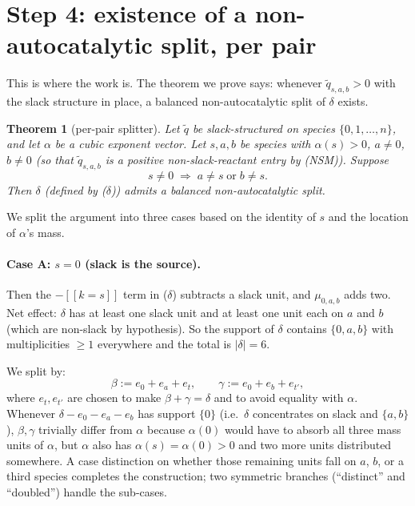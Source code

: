 \documentclass[11pt]{article}
\newtheorem{theorem}{Theorem}
\newcommand{\iv}[1]{[\![#1]\!]}
\begin{document}
\section{Step 4: existence of a non-autocatalytic split, per pair}

This is where the work is. The theorem we prove says: whenever
$\widetilde q_{s,a,b} > 0$ with the slack structure in place,
a balanced non-autocatalytic split of $\delta$ exists.

\begin{theorem}[per-pair splitter]
\label{thm:per-pair}
Let $\widetilde q$ be slack-structured on species $\{0,1,\dots,n\}$, and
let $\alpha$ be a cubic exponent vector. Let $s, a, b$ be species with
$\alpha(s) > 0$, $a \ne 0$, $b \ne 0$ (so that $\widetilde q_{s,a,b}$ is
a positive \emph{non-slack-reactant} entry by (NSM)). Suppose
\begin{equation}
   s \ne 0 \;\Longrightarrow\; a \ne s \;\text{or}\; b \ne s. \tag{$\star$}
\end{equation}
Then $\delta$ (defined by ($\delta$)) admits a balanced non-autocatalytic
split.
\end{theorem}

We split the argument into three cases based on the identity of $s$ and
the location of $\alpha$'s mass.

\paragraph{Case A: $s = 0$ (slack is the source).}
Then the $-\iv{k=s}$ term in ($\delta$) subtracts a slack unit, and
$\mu_{0,a,b}$ adds two. Net effect: $\delta$ has at least one slack unit
and at least one unit each on $a$ and $b$ (which are non-slack by
hypothesis). So the support of $\delta$ contains $\{0, a, b\}$ with
multiplicities $\ge 1$ everywhere and the total is $|\delta| = 6$.

We split by:
\[
   \beta := e_0 + e_a + e_t, \qquad \gamma := e_0 + e_b + e_{t'},
\]
where $e_t, e_{t'}$ are chosen to make $\beta + \gamma = \delta$ and
to avoid equality with $\alpha$. Whenever $\delta - e_0 - e_a - e_b$
has support $\{0\}$ (i.e.\ $\delta$ concentrates on slack and $\{a,b\}$),
$\beta, \gamma$ trivially differ from $\alpha$ because $\alpha(0)$ would
have to absorb all three mass units of $\alpha$, but $\alpha$ also has
$\alpha(s) = \alpha(0) > 0$ and two more units distributed somewhere.
A case distinction on whether those remaining units fall on $a$, $b$,
or a third species completes the construction; two symmetric branches
(``distinct'' and ``doubled'') handle the sub-cases.
\end{document}
